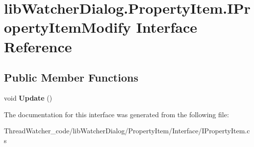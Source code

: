 \hypertarget{interfacelib_watcher_dialog_1_1_property_item_1_1_i_property_item_modify}{\section{lib\+Watcher\+Dialog.\+Property\+Item.\+I\+Property\+Item\+Modify Interface Reference}
\label{interfacelib_watcher_dialog_1_1_property_item_1_1_i_property_item_modify}
}
\subsection*{Public Member Functions}
\begin{DoxyCompactItemize}
\item 
\hypertarget{interfacelib_watcher_dialog_1_1_property_item_1_1_i_property_item_modify_adb142943ae495ac18ffda6d45f15fd67}{void {\bfseries Update} ()}\label{interfacelib_watcher_dialog_1_1_property_item_1_1_i_property_item_modify_adb142943ae495ac18ffda6d45f15fd67}

\end{DoxyCompactItemize}


The documentation for this interface was generated from the following file\+:\begin{DoxyCompactItemize}
\item 
Thread\+Watcher\+\_\+code/lib\+Watcher\+Dialog/\+Property\+Item/\+Interface/I\+Property\+Item.\+cs\end{DoxyCompactItemize}
